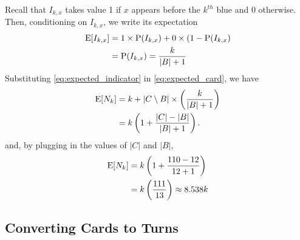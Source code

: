 Recall that $I_{k,x}$ takes value 1 if $x$ appears before the 
$k^{th}$ blue and 0 otherwise.
Then, conditioning on $I_{k,x}$, we write its expectation
\begin{align} \label{eq:expected_indicator}
    \operatorname{\mathrm{E}}[I_{k,x}] &= 1 \times \operatorname{\mathrm{P}}(I_{k,x})
    + 0 \times (1-\operatorname{\mathrm{P}}(I_{k,x}) \nonumber \\
    &=\operatorname{\mathrm{P}}(I_{k,x}) = \frac{k}{|B| + 1}
\end{align}
Substituting \cref{eq:expected_indicator} in \cref{eq:expected_card},
we have
\begin{align}
    \operatorname{\mathrm{E}}[N_k] &= k + |C \setminus B| \times \left(\frac{k}{|B| + 1}\right)
    \nonumber \\
    &= k \left(1 + \frac{|C| - |B|}{|B| + 1} \right). \nonumber
\end{align}
and, by plugging in the values of $|C|$ and $|B|$,
\begin{align}
    \operatorname{\mathrm{E}}[N_k] &= k \left(1 + \frac{110 - 12}{12 + 1} \right) \nonumber \\
    &= k \left(\frac{111}{13}\right) \approx 8.538k
\end{align}

\subsection{Converting Cards to Turns}\label{sec:converting}